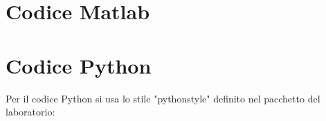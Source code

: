 \documentclass{00-settings/document}
\begin{document}



\appendix
\section{Codice Matlab}


\section{Codice Python}
Per il codice Python si usa lo stile "pythonstyle" definito nel pacchetto del laboratorio:

\end{document}
